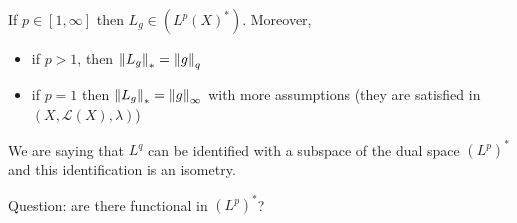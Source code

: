 \begin{proposition}
    If \(p \in [1, \infty]\) then \(L_g \in (L^p(X)^*)\). Moreover, 
    \begin{itemize}
        \item if \(p > 1\), then \(\norm{L_g}_* = \norm{g}_{{q}}\)
        \item if \(p=1\) then \(\norm{L_g}_* = \norm{g}_{\infty}\) with more assumptions (they are satisfied in \((X, \mathcal{L}(X), \lambda)\))
    \end{itemize}
\end{proposition}

\begin{remark}
    We are saying that \(L^{{q}}\) can be identified with a subspace of the dual space \((L^p)^*\) and this identification is an isometry.
\end{remark}

Question: are there functional in \((L^p)^*\)?

